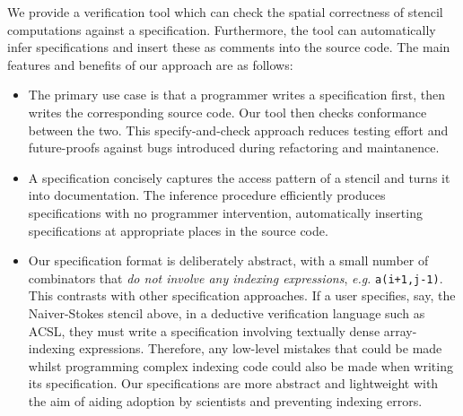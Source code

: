 \documentclass[10pt,preprint]{sigplanconf}
\theoremstyle{definition}
\newcommand{\eg}{\emph{e.g.}}
\begin{document}
We provide a verification tool which can check the spatial correctness
of stencil computations against a specification. Furthermore, the tool
can automatically infer specifications and insert these as comments
into the source code. The main features and benefits of our approach
are as follows:
%
\begin{itemize}
\item The primary use case is that a programmer writes a specification first,
  then writes the corresponding source code. Our tool then checks conformance between
  the two. This specify-and-check approach reduces testing effort and
  future-proofs against bugs introduced during refactoring and maintanence.
%

\item A specification concisely captures the access pattern of a
  stencil and turns it into documentation. The inference procedure
  efficiently produces specifications with no programmer intervention,
  automatically inserting specifications at appropriate places in the
  source code.
%
%
\item Our specification format is deliberately abstract, with a small number of
  combinators that \emph{do not involve any indexing expressions}, \eg{}
  \texttt{a(i+1,j-1)}. This contrasts with other specification approaches. If a
  user specifies, say, the Naiver-Stokes stencil above, in a deductive
  verification language such as ACSL, they must write a specification involving
  textually dense array-indexing expressions. Therefore, any low-level mistakes
  that could be made whilst programming complex indexing code could also be
  made when writing its specification. Our specifications are more abstract and
  lightweight with the aim of aiding adoption by scientists and preventing
  indexing errors.
\end{itemize}
\end{document}
